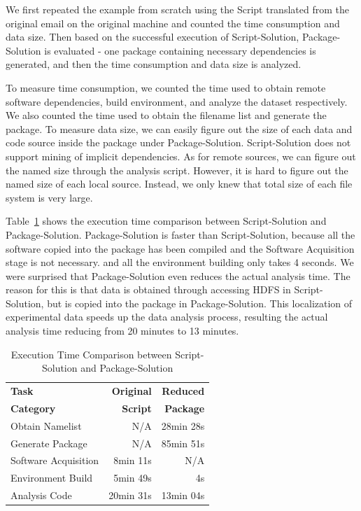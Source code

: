\documentclass{sig-alternate}
\begin{document}
We first repeated the example from scratch using the Script translated from the original email on the original machine and counted the time consumption and data size. 
Then based on the successful execution of Script-Solution, Package-Solution is evaluated - one package containing necessary dependencies is generated, and then the time consumption and data size is analyzed. 

To measure time consumption, we counted the time used to obtain remote software dependencies, build environment, and analyze the dataset respectively. We also counted the time used to obtain the filename list and generate the package. To measure data size, we can easily figure out the size of each data and code source inside the package under Package-Solution.
Script-Solution does not support mining of implicit dependencies. As for remote sources, we can figure out the named size through the analysis script. However, it is hard to figure out the named size of each local source. 
Instead, we only knew that total size of each file system is very large.

Table~\ref{table:time-2nd3rd} shows the execution time comparison between
Script-Solution and Package-Solution.
Package-Solution is faster than Script-Solution, because all the software copied into the package has been compiled and the Software Acquisition stage is not necessary.
and all the environment building only takes 4 seconds.
We were surprised that Package-Solution even reduces the actual analysis time. 
The reason for this is that data is obtained through accessing HDFS in Script-Solution, but is copied into the package in Package-Solution. This localization of experimental data speeds up the data analysis process, resulting the actual analysis time reducing from 20 minutes to 13 minutes.

\begin{table}
    \centering
    \begin{tabular}{|l|r|r|}
    \hline
    \bf Task & \bf Original& \bf Reduced\\ 
    \bf Category & \bf Script & \bf Package\\ \hline
    Obtain Namelist & N/A & 28min 28s \\ \hline
    Generate Package & N/A & 85min 51s \\ \hline
    Software Acquisition & 8min 11s & N/A \\ \hline
    Environment Build & 5min 49s  & 4s \\ \hline
    Analysis Code & 20min 31s & 13min 04s \\ \hline
    \end{tabular}
    \caption{Execution Time Comparison between Script-Solution and Package-Solution}
    \label{table:time-2nd3rd}
\end{table}    
\end{document}
